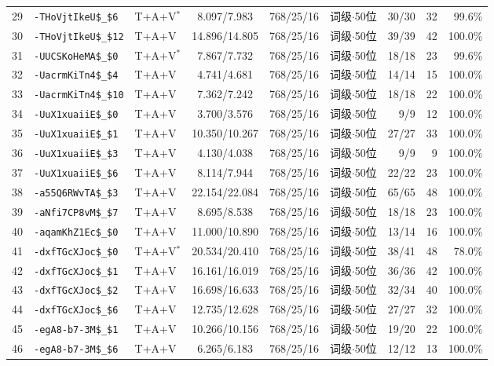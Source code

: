 \begin{longtable}{rllcccrrr}
29 & \texttt{-THoVjtIkeU\$\_\$6} & T+A+V$^{*}$ & 8.097/7.983 & 768/25/16 & 词级$\cdot$50位 & 30/30 & 32 & 99.6\% \\
30 & \texttt{-THoVjtIkeU\$\_\$12} & T+A+V & 14.896/14.805 & 768/25/16 & 词级$\cdot$50位 & 39/39 & 42 & 100.0\% \\
31 & \texttt{-UUCSKoHeMA\$\_\$0} & T+A+V$^{*}$ & 7.867/7.732 & 768/25/16 & 词级$\cdot$50位 & 18/18 & 23 & 99.6\% \\
32 & \texttt{-UacrmKiTn4\$\_\$4} & T+A+V & 4.741/4.681 & 768/25/16 & 词级$\cdot$50位 & 14/14 & 15 & 100.0\% \\
33 & \texttt{-UacrmKiTn4\$\_\$10} & T+A+V & 7.362/7.242 & 768/25/16 & 词级$\cdot$50位 & 18/18 & 22 & 100.0\% \\
34 & \texttt{-UuX1xuaiiE\$\_\$0} & T+A+V & 3.700/3.576 & 768/25/16 & 词级$\cdot$50位 & 9/9 & 12 & 100.0\% \\
35 & \texttt{-UuX1xuaiiE\$\_\$1} & T+A+V & 10.350/10.267 & 768/25/16 & 词级$\cdot$50位 & 27/27 & 33 & 100.0\% \\
36 & \texttt{-UuX1xuaiiE\$\_\$3} & T+A+V & 4.130/4.038 & 768/25/16 & 词级$\cdot$50位 & 9/9 & 9 & 100.0\% \\
37 & \texttt{-UuX1xuaiiE\$\_\$6} & T+A+V & 8.114/7.944 & 768/25/16 & 词级$\cdot$50位 & 22/22 & 23 & 100.0\% \\
38 & \texttt{-a55Q6RWvTA\$\_\$3} & T+A+V & 22.154/22.084 & 768/25/16 & 词级$\cdot$50位 & 65/65 & 48 & 100.0\% \\
39 & \texttt{-aNfi7CP8vM\$\_\$7} & T+A+V & 8.695/8.538 & 768/25/16 & 词级$\cdot$50位 & 18/18 & 23 & 100.0\% \\
40 & \texttt{-aqamKhZ1Ec\$\_\$0} & T+A+V & 11.000/10.890 & 768/25/16 & 词级$\cdot$50位 & 13/14 & 16 & 100.0\% \\
41 & \texttt{-dxfTGcXJoc\$\_\$0} & T+A+V$^{*}$ & 20.534/20.410 & 768/25/16 & 词级$\cdot$50位 & 38/41 & 48 & 78.0\% \\
42 & \texttt{-dxfTGcXJoc\$\_\$1} & T+A+V & 16.161/16.019 & 768/25/16 & 词级$\cdot$50位 & 36/36 & 42 & 100.0\% \\
43 & \texttt{-dxfTGcXJoc\$\_\$2} & T+A+V & 16.698/16.633 & 768/25/16 & 词级$\cdot$50位 & 32/34 & 40 & 100.0\% \\
44 & \texttt{-dxfTGcXJoc\$\_\$6} & T+A+V & 12.735/12.628 & 768/25/16 & 词级$\cdot$50位 & 27/27 & 32 & 100.0\% \\
45 & \texttt{-egA8-b7-3M\$\_\$1} & T+A+V & 10.266/10.156 & 768/25/16 & 词级$\cdot$50位 & 19/20 & 22 & 100.0\% \\
46 & \texttt{-egA8-b7-3M\$\_\$6} & T+A+V & 6.265/6.183 & 768/25/16 & 词级$\cdot$50位 & 12/12 & 13 & 100.0\% \\

\end{longtable}
